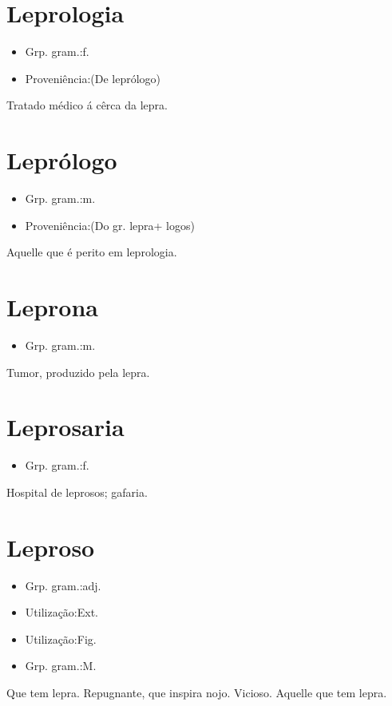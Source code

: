 \section{Leprologia}
\begin{itemize}
\item {Grp. gram.:f.}
\end{itemize}
\begin{itemize}
\item {Proveniência:(De \textunderscore leprólogo\textunderscore )}
\end{itemize}
Tratado médico á cêrca da lepra.
\section{Leprólogo}
\begin{itemize}
\item {Grp. gram.:m.}
\end{itemize}
\begin{itemize}
\item {Proveniência:(Do gr. \textunderscore lepra\textunderscore  + \textunderscore logos\textunderscore )}
\end{itemize}
Aquelle que é perito em leprologia.
\section{Leprona}
\begin{itemize}
\item {Grp. gram.:m.}
\end{itemize}
Tumor, produzido pela lepra.
\section{Leprosaria}
\begin{itemize}
\item {Grp. gram.:f.}
\end{itemize}
Hospital de leprosos; gafaria.
\section{Leproso}
\begin{itemize}
\item {Grp. gram.:adj.}
\end{itemize}
\begin{itemize}
\item {Utilização:Ext.}
\end{itemize}
\begin{itemize}
\item {Utilização:Fig.}
\end{itemize}
\begin{itemize}
\item {Grp. gram.:M.}
\end{itemize}
Que tem lepra.
Repugnante, que inspira nojo.
Vicioso.
Aquelle que tem lepra.
